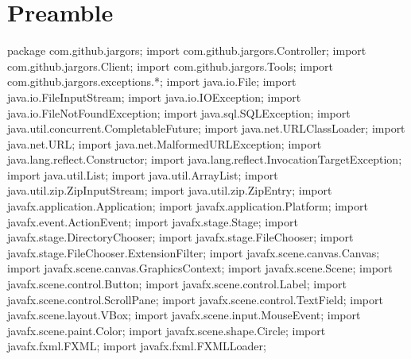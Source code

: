 \section{Preamble}
\nwenddocs{}\endmoddef{}
package com.github.jargors;
import com.github.jargors.Controller;
import com.github.jargors.Client;
import com.github.jargors.Tools;
import com.github.jargors.exceptions.*;
\nwendcode{}\nwdocspar
\nwenddocs{}\plusendmoddef
import java.io.File;
import java.io.FileInputStream;
import java.io.IOException;
import java.io.FileNotFoundException;
import java.sql.SQLException;
import java.util.concurrent.CompletableFuture;
import java.net.URLClassLoader;
import java.net.URL;
import java.net.MalformedURLException;
import java.lang.reflect.Constructor;
import java.lang.reflect.InvocationTargetException;
import java.util.List;
import java.util.ArrayList;
import java.util.zip.ZipInputStream;
import java.util.zip.ZipEntry;
\nwendcode{}\nwdocspar
\nwenddocs{}\plusendmoddef
import javafx.application.Application;
import javafx.application.Platform;
import javafx.event.ActionEvent;
import javafx.stage.Stage;
import javafx.stage.DirectoryChooser;
import javafx.stage.FileChooser;
import javafx.stage.FileChooser.ExtensionFilter;
import javafx.scene.canvas.Canvas;
import javafx.scene.canvas.GraphicsContext;
import javafx.scene.Scene;
import javafx.scene.control.Button;
import javafx.scene.control.Label;
import javafx.scene.control.ScrollPane;
import javafx.scene.control.TextField;
import javafx.scene.layout.VBox;
import javafx.scene.input.MouseEvent;
import javafx.scene.paint.Color;
import javafx.scene.shape.Circle;
import javafx.fxml.FXML;
import javafx.fxml.FXMLLoader;
\nwendcode{}\nwdocspar

